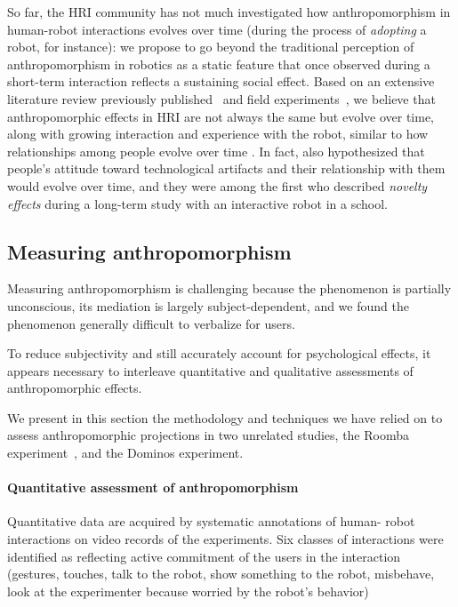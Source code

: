 \documentclass{frontiersSCNS} %
\begin{document}
So far, the HRI community has not much investigated how anthropomorphism in
human-robot interactions evolves over time (during the process of
\emph{adopting} a robot, for instance): we propose to go beyond the traditional
perception of anthropomorphism in robotics as a static feature that once
observed during a short-term interaction reflects a sustaining social effect.
Based on an extensive literature review previously
published~\cite{fink_anthropomorphism_2012} and field
experiments~, we believe that anthropomorphic effects in HRI are
not always the same but evolve over time, along with growing interaction and
experience with the robot, similar to how relationships among people evolve
over time . In fact, \cite{kanda_interactive_2004}
also hypothesized that people's attitude toward technological artifacts and
their relationship with them would evolve over time, and they were among the
first who described \emph{novelty effects} during a long-term study with an
interactive robot in a school.

\subsection{Measuring anthropomorphism}

Measuring anthropomorphism is challenging because the phenomenon is partially
unconscious, its mediation is largely subject-dependent, and we found the
phenomenon generally difficult to verbalize for users.

To reduce subjectivity and still accurately account for psychological effects,
it appears necessary to interleave quantitative and qualitative assessments of
anthropomorphic effects.

We present in this section the methodology and techniques we have relied on to
assess anthropomorphic projections in two unrelated studies, the Roomba
experiment~\cite{fink_living_2013}, and the Dominos experiment.

\paragraph{Quantitative assessment of anthropomorphism} Quantitative data are
acquired by systematic annotations of human- robot interactions on video records
of the experiments. Six classes of interactions were identified as reflecting
active commitment of the users in the interaction (gestures, touches, talk to
the robot, show something to the robot, misbehave, look at the experimenter
because worried by the robot's behavior)
\end{document}
